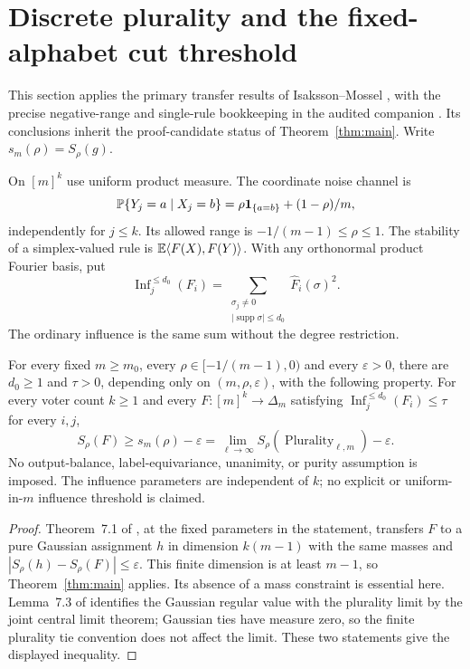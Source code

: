 \section{Discrete plurality and the fixed-alphabet cut threshold}
\label{sec:discrete}
This section applies the primary transfer results of Isaksson--Mossel
\cite{IM}, with the precise negative-range and single-rule bookkeeping
in the audited companion \cite{transfer}. Its conclusions inherit the
proof-candidate status of Theorem~\ref{thm:main}.
Write $s_m(\rho)=S_\rho(g)$.

On $[m]^k$ use uniform product measure. The coordinate noise channel is
\begin{equation}\label{eq:discrete-channel}
 \mathbb P\{Y_j=a\mid X_j=b\}
       =\rho\mathbf 1_{\{a=b\}}+(1-\rho)/m,
\end{equation}
independently for $j\le k$. Its allowed range is
$-1/(m-1)\le\rho\le1$. The stability of a simplex-valued rule is
$\mathbb E\langle F(X),F(Y)\rangle$. With any orthonormal product Fourier basis, put
\[
 \operatorname{Inf}^{\le d_0}_j(F_i)
  =\sum_{\substack{\sigma_j\ne0\\|\operatorname{supp}\sigma|\le d_0}}
                   \widehat F_i(\sigma)^2.
\]
The ordinary influence is the same sum without the degree restriction.

\begin{corollary}\label{cor:plurality}
For every fixed $m\ge m_0$, every $\rho\in[-1/(m-1),0)$ and every
$\varepsilon>0$, there are $d_0\ge1$ and $\tau>0$, depending only on
$(m,\rho,\varepsilon)$, with the following property. For every voter
count $k\ge1$ and every $F:[m]^k\to\Delta_m$ satisfying
$\operatorname{Inf}^{\le d_0}_j(F_i)\le\tau$ for every $i,j$,
\[
 S_\rho(F)\ge s_m(\rho)-\varepsilon
   =\lim_{\ell\to\infty}S_\rho(\operatorname{Plurality}_{\ell,m})
       -\varepsilon.
\]
No output-balance, label-equivariance, unanimity, or purity assumption
is imposed. The influence parameters are independent of $k$; no
explicit or uniform-in-$m$ influence threshold is claimed.
\end{corollary}
\begin{proof}
Theorem~7.1 of \cite{IM}, at the fixed parameters in the statement,
transfers $F$ to a pure Gaussian assignment $h$ in dimension
$k(m-1)$ with the same masses and
$|S_\rho(h)-S_\rho(F)|\le\varepsilon$.
This finite dimension is at least $m-1$, so Theorem~\ref{thm:main}
applies. Its absence of a mass constraint is essential here.
Lemma~7.3 of \cite{IM} identifies the Gaussian regular value with the
plurality limit by the joint central limit theorem; Gaussian ties have
measure zero, so the finite plurality tie convention does not affect
the limit. These two statements give the displayed inequality.
\end{proof}


